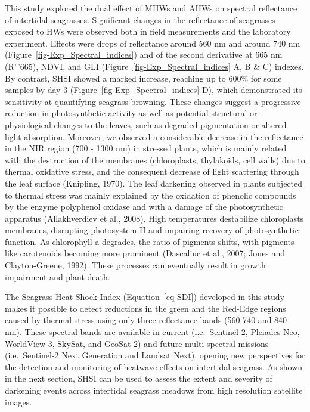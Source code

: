\documentclass[
  letterpaper,
  DIV=11,
  numbers=noendperiod]{scrartcl}
\begin{document}
This study explored the dual effect of MHWs and AHWs on spectral
reflectance of intertidal seagrasses. Significant changes in the
reflectance of seagrasses exposed to HWs were observed both in field
measurements and the laboratory experiment. Effects were drops of
reflectance around 560 nm and around 740 nm
(Figure~\ref{fig-Exp_Spectral_indices}) and of the second derivative at
665 nm (R'\,'665), NDVI, and GLI (Figure~\ref{fig-Exp_Spectral_indices}
A, B \& C) indexes. By contrast, SHSI showed a marked increase, reaching
up to 600\% for some samples by day 3
(Figure~\ref{fig-Exp_Spectral_indices} D), which demonstrated its
sensitivity at quantifying seagrass browning. These changes suggest a
progressive reduction in photosynthetic activity as well as potential
structural or physiological changes to the leaves, such as degraded
pigmentation or altered light absorption. Moreover, we observed a
considerable decrease in the reflectance in the NIR region (700 - 1300
nm) in stressed plants, which is mainly related with the destruction of
the membranes (chloroplasts, thylakoids, cell walls) due to thermal
oxidative stress, and the consequent decrease of light scattering
through the leaf surface (Knipling, 1970). The leaf darkening observed
in plants subjected to thermal stress was mainly explained by the
oxidation of phenolic compounds by the enzyme polyphenol oxidase and
with a damage of the photosynthetic apparatus (Allakhverdiev et al.,
2008). High temperatures destabilize chloroplasts membranes, disrupting
photosystem II and impairing recovery of photosynthetic function. As
chlorophyll-a degrades, the ratio of pigments shifts, with pigments like
carotenoids becoming more prominent (Dascaliuc et al., 2007; Jones and
Clayton-Greene, 1992). These processes can eventually result in growth
impairment and plant death.

The Seagrass Heat Shock Index (Equation~\ref{eq-SDI}) developed in this
study makes it possible to detect reductions in the green and the
Red-Edge regions caused by thermal stress using only three reflectance
bands (560 740 and 840 nm). These spectral bands are available in
current (i.e.~Sentinel-2, Pleiades-Neo, WorldView-3, SkySat, and
GeoSat-2) and future multi-spectral missions (i.e.~Sentinel-2 Next
Generation and Landsat Next), opening new perspectives for the detection
and monitoring of heatwave effects on intertidal seagrass. As shown in
the next section, SHSI can be used to assess the extent and severity of
darkening events across intertidal seagrass meadows from high resolution
satellite images.
\end{document}
